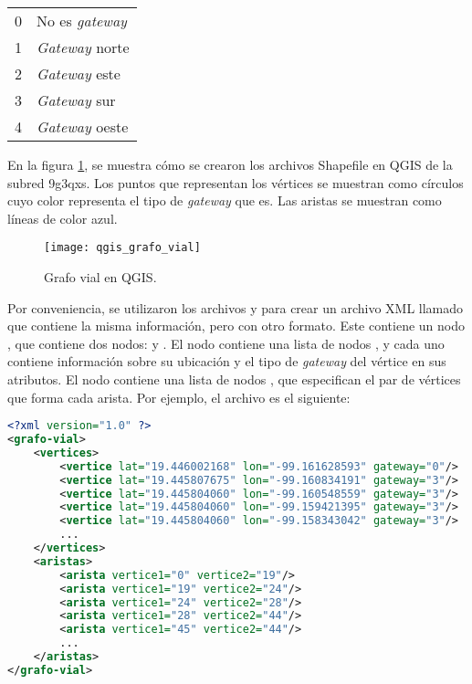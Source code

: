 \begin{tabular}{ r l }
0 & No es \textit{gateway} \\
1 & \textit{Gateway} norte \\
2 & \textit{Gateway} este \\
3 & \textit{Gateway} sur \\
4 & \textit{Gateway} oeste \\
\end{tabular}

En la figura \ref{fig:qgis_grafo_vial}, se muestra cómo se crearon los
archivos Shapefile en QGIS de la subred 9g3qxs. Los puntos que representan los
vértices se muestran como círculos cuyo color representa el tipo de
\textit{gateway} que es. Las aristas se muestran como líneas de color azul.

\begin{figure}[th!]
\centering
\texttt{[image: qgis\_grafo\_vial]}
\decoRule
\caption[Grafo vial en QGIS]{Grafo vial en QGIS.}
\label{fig:qgis_grafo_vial}
\end{figure}

Por conveniencia, se utilizaron los archivos  y
 para crear un archivo XML llamado  que contiene la misma información, pero con otro formato. Este
contiene un nodo , que contiene dos nodos:  y
. El nodo  contiene una lista de nodos
, y cada uno contiene información sobre su ubicación y el tipo de
\textit{gateway} del vértice en sus atributos. El nodo  contiene
una lista de nodos , que especifican el par de vértices que forma
cada arista. Por ejemplo, el archivo  es el
siguiente:
\newpage

\begin{lstlisting}[language=XML]
<?xml version="1.0" ?>
<grafo-vial>
    <vertices>
        <vertice lat="19.446002168" lon="-99.161628593" gateway="0"/>
        <vertice lat="19.445807675" lon="-99.160834191" gateway="3"/>
        <vertice lat="19.445804060" lon="-99.160548559" gateway="3"/>
        <vertice lat="19.445804060" lon="-99.159421395" gateway="3"/>
        <vertice lat="19.445804060" lon="-99.158343042" gateway="3"/>
        ...
    </vertices>
    <aristas>
        <arista vertice1="0" vertice2="19"/>
        <arista vertice1="19" vertice2="24"/>
        <arista vertice1="24" vertice2="28"/>
        <arista vertice1="28" vertice2="44"/>
        <arista vertice1="45" vertice2="44"/>
        ...
    </aristas>
</grafo-vial>
\end{lstlisting}

